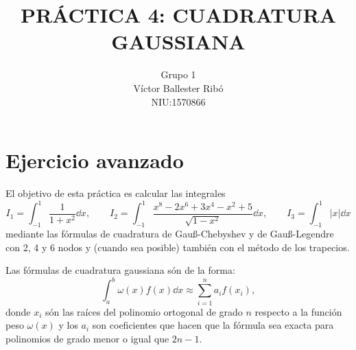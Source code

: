 \documentclass[a4paper]{article}
\title{\bfseries\Large PRÁCTICA 4: CUADRATURA GAUSSIANA}
\author{Grupo 1\\Víctor Ballester Ribó\\NIU:1570866}
\date{\parbox{\linewidth}{\centering
  Métodos numéricos\endgraf
  Grado en Matemáticas\endgraf
  Universitat Autònoma de Barcelona\endgraf
  4 de Junio de 2021}}
\begin{document}
\maketitle
\thispagestyle{empty}
\newpage
\setcounter{page}{1}
\restoregeometry
\section{Ejercicio avanzado}\label{ejercicioavanzado}
El objetivo de esta práctica es calcular las integrales
$$I_1=\int_{-1}^1\frac{1}{1+x^2}\dd x,\qquad I_2=\int_{-1}^1\frac{x^8-2x^6+3x^4-x^2+5}{\sqrt{1-x^2}}\dd x,\qquad I_3=\int_{-1}^1|x|\dd x$$ mediante las fórmulas de cuadratura de Gau\ss-Chebyshev y de Gau\ss-Legendre con 2, 4 y 6 nodos y (cuando sea posible) también con el método de los trapecios.\par 
Las fórmulas de cuadratura gaussiana són de la forma: 
\begin{equation}
    \int_a^b\omega(x)f(x)\dd x\approx\sum_{i=1}^na_if(x_i),
    \label{gauss}
\end{equation}
donde $x_i$ són las raíces del polinomio ortogonal de grado $n$ respecto a la función peso $\omega(x)$ y los $a_i$ son coeficientes que hacen que la fórmula sea exacta para polinomios de grado menor o igual que $2n-1$.
\end{document}
